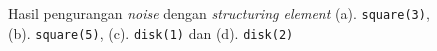 \begin{figure}[h!]
\begin{center}
\caption{Hasil pengurangan \textit{noise} dengan \textit{structuring element} (a). \texttt{square(3)}, (b). \texttt{square(5)}, (c). \texttt{disk(1)} dan (d). \texttt{disk(2)}}
\label{fig:deNoise}
\end{center}
\end{figure}
